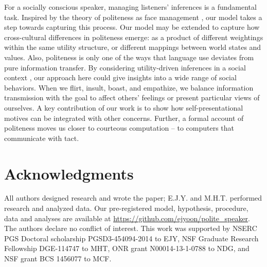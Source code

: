 \documentclass[12pt]{article}
\begin{document}
For a socially conscious speaker, managing listeners' inferences is a fundamental task. Inspired by the theory of politeness as face management \cite{brown1987}, our model takes a step towards capturing this process. Our model may be extended to capture how cross-cultural differences in politeness emerge: as a product of different weightings within the same utility structure, or different mappings between world states and values. Also, politeness is only one of the ways that language use deviates from pure information transfer. By considering utility-driven inferences in a social context \cite{baker2017rational, hamlin2013mentalistic},
our approach here could give insights into a wide range of social behaviors. When we flirt, insult, boast, and empathize, we balance information transmission with the goal to affect others' feelings or present particular views of ourselves. A key contribution of our work is to show how self-presentational motives can be integrated with other concerns. Further, a formal account of politeness moves us closer to courteous computation -- to computers that communicate with tact.











\section*{Acknowledgments}
All authors designed research and wrote the paper;
E.J.Y. and M.H.T. performed research and analyzed data.
Our pre-registered model,
hypothesis, procedure, data and analyses are available at
\url{https://github.com/ejyoon/polite_speaker}.
The authors declare no conflict of interest.
This work was supported by NSERC PGS Doctoral scholarship
PGSD3-454094-2014 to EJY, NSF Graduate Research Fellowship DGE-114747 to
MHT, ONR grant N00014-13-1-0788 to NDG, and NSF grant BCS 1456077 to
MCF.
\end{document}
